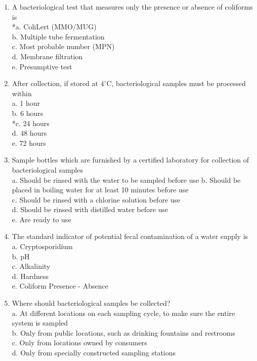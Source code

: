 \begin{enumerate}[1.]
\item A bacteriological test that measures only the presence or absence of coliforms is\\
*a. ColiLert (MMO/MUG)\\
b. Multiple tube fermentation\\
c. Most probable number (MPN)\\
d. Membrane filtration\\
e. Presumptive test\\
\item After collection, if stored at $4^{\circ} \mathrm{C}$, bacteriological samples must be processed within\\
a. 1 hour\\
b. 6 hours\\
*c. 24 hours\\
d. 48 hours\\
e. 72 hours\\
\item Sample bottles which are furnished by a certified laboratory for collection of bacteriological samples\\
a. Should be rinsed with the water to be sampled before use b. Should be placed in boiling water for at least 10 minutes before use\\
c. Should be rinsed with a chlorine solution before use\\
d. Should be rinsed with distilled water before use\\
e. Are ready to use\\
\item The standard indicator of potential fecal contamination of a water supply is\\
a. Cryptosporidium\\
b. $\mathrm{pH}$\\
c. Alkalinity\\
d. Hardness\\
e. Coliform Presence - Absence\\
\item Where should bacteriological samples be collected?\\
a. At different locations on each sampling cycle, to make sure the entire system is sampled\\
b. Only from public locations, such as drinking fountains and restrooms\\
c. Only from locations owned by consumers\\
d. Only from specially constructed sampling stations\\

\end{enumerate}
